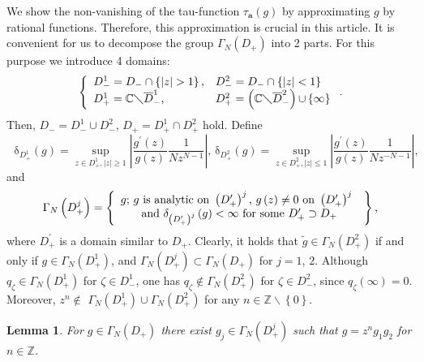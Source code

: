 \documentclass[a4paper]{article}%
\newtheorem{lemma}{Lemma}
\begin{document}
We show the non-vanishing of the tau-function $\tau_{\boldsymbol{a}}\left(
g\right)  $ by approximating $g$ by rational functions. Therefore, this
approximation is crucial in this article. It is convenient for us to decompose
the group $\Gamma_{N}\left(  D_{+}\right)  $ into 2 parts. For this purpose we
introduce 4 domains:%
\[
\left\{
\begin{array}
[c]{ll}%
D_{-}^{1}=D_{-}\cap\left\{  \left\vert z\right\vert >1\right\}  \text{,} &
D_{-}^{2}=D_{-}\cap\left\{  \left\vert z\right\vert <1\right\} \\
D_{+}^{1}=\mathbb{C}\diagdown\overline{D}_{-}^{1}\text{,} & D_{+}^{2}=\left(
\mathbb{C}\diagdown\overline{D}_{-}^{2}\right)  \mathbb{\cup}\left\{
\infty\right\}
\end{array}
\right.  \text{.}%
\]
Then, $D_{-}=D_{-}^{1}\cup D_{-}^{2}$, $D_{+}=D_{+}^{1}\cap D_{+}^{2}$ hold.
Define%
\[
\text{\ }\mathrm{\delta}_{D_{+}^{1}}\left(  g\right)  =\sup_{z\in D_{+}%
^{1},\left\vert z\right\vert \geq1}\left\vert \dfrac{g^{\prime}(z)}%
{g(z)}\dfrac{1}{Nz^{N-1}}\right\vert \text{, \ }\mathrm{\delta}_{D_{+}^{2}%
}\left(  g\right)  =\sup_{z\in D_{+}^{2},\left\vert z\right\vert \leq
1}\left\vert \dfrac{g^{\prime}(z)}{g(z)}\dfrac{1}{Nz^{-N-1}}\right\vert
\text{,}%
\]
and%
\[
\Gamma_{N}\left(  D_{+}^{j}\right)  =\left\{
\begin{array}
[c]{c}%
g\text{; }g\text{ is analytic on }\left(  D_{+}^{\prime}\right)  ^{j}\text{,
}g\left(  z\right)  \neq0\text{ on }\left(  D_{+}^{\prime}\right)  ^{j}\text{
}\\
\text{and }\mathrm{\delta}_{\left(  D_{+}^{\prime}\right)  ^{j}}\left(
g\right)  <\infty\text{ for some }D_{+}^{\prime}\supset D_{+}%
\end{array}
\right\}  \text{,}%
\]
where $D_{+}^{\prime}$ is a domain similar to $D_{+}$. Clearly, it holds that
$\widetilde{g}\in\Gamma_{N}\left(  D_{+}^{2}\right)  $ if and only if
$g\in\Gamma_{N}\left(  D_{+}^{1}\right)  $, and $\Gamma_{N}\left(  D_{+}%
^{j}\right)  \subset\Gamma_{N}\left(  D_{+}\right)  $ for $j=1$, $2$. Although
$q_{\zeta}\in\Gamma_{N}\left(  D_{+}^{1}\right)  $ for $\zeta\in D_{-}^{1}$,
one has $q_{\zeta}\notin\Gamma_{N}\left(  D_{+}^{2}\right)  $ for $\zeta\in
D_{-}^{2}$, since $q_{\zeta}\left(  \infty\right)  =0$. Moreover, $z^{n}%
\notin$ $\Gamma_{N}\left(  D_{+}^{1}\right)  \cup\Gamma_{N}\left(  D_{+}%
^{2}\right)  $ for any $n\in\mathbb{Z}\backslash\left\{  0\right\}  $.

\begin{lemma}
\label{l2-7}For $g\in\Gamma_{N}\left(  D_{+}\right)  $ there exist $g_{j}%
\in\Gamma_{N}\left(  D_{+}^{j}\right)  $ such that $g=z^{n}g_{1}g_{2}$ for
$n\in\mathbb{Z}$.
\end{lemma}
\end{document}
